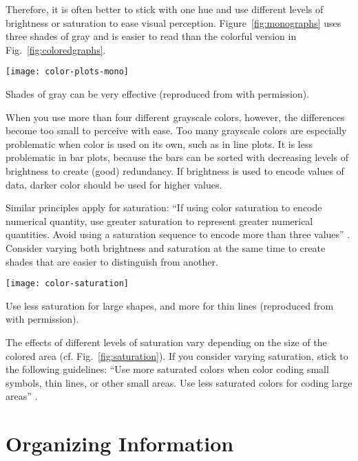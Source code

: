 Therefore, it is often better to stick with one hue and use different levels of brightness or saturation to ease visual perception. Figure~\ref{fig:monographs} uses three shades of gray and is easier to read than the colorful version in Fig.~\ref{fig:coloredgraphs}.


\begin{marginfigure}
\centering
\texttt{[image: color-plots-mono]}
\caption{\label{fig:monographs} Shades of gray can be very effective (reproduced from \cite{Carter12} with permission).}%
\end{marginfigure}

When you use more than four different grayscale colors, however, the differences become too small to perceive with ease. Too many grayscale colors are especially problematic when color is used on its own, such as in line plots. It is less problematic in bar plots, because the bars can be sorted with decreasing levels of brightness to create (good) redundancy. If brightness is used to encode values of data, darker color should be used for higher values.

Similar principles apply for saturation: ``If using color saturation to encode numerical quantity, use greater saturation to represent greater numerical quantities. Avoid using a saturation sequence to encode more than three values'' \cite{Ware12}. Consider varying both brightness and saturation at the same time to create shades that are easier to distinguish from another.

\begin{marginfigure}
\centering
\texttt{[image: color-saturation]}
\caption{\label{fig:saturation} Use less saturation for large shapes, and more for thin lines (reproduced from \cite{Ware12} with permission).}%
\end{marginfigure}

The effects of different levels of saturation vary depending on the size of the colored area (cf. Fig.~\ref{fig:saturation}). If you consider varying saturation, stick to the following guidelines: ``Use more saturated colors when color coding small symbols, thin lines, or other small areas. Use less saturated colors for coding large areas'' \cite{Ware12}.


\section{Organizing Information}
\label{sec:organizinginfo}

